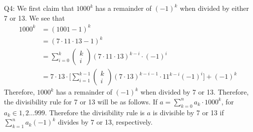\documentclass[letterpaper]{article}
\begin{document}
Q4: We first claim that $1000^k$ has a remainder of $(-1)^k$ when divided by either 7 or 13. We see that 
\begin{align*}
    1000^k & = (1001-1)^k
    \\ & = (7\cdot 11 \cdot 13 -1)^k
    \\ & = \sum_{i=0}^k \begin{pmatrix} k \\ i \end{pmatrix} (7\cdot 11 \cdot 13)^{k-i}\cdot (-1)^{i}
    \\ & = 7\cdot 13 \cdot \Bigg[\sum_{i=1}^{k-1}\begin{pmatrix} k \\ i \end{pmatrix} (7\cdot 13)^{k-i-1} \cdot 11^{k-i} (-1)^i \Bigg] + (-1)^k
\end{align*}Therefore, $1000^k$ has a remainder of $(-1)^k$ when divided by 7 or 13. Therefore, the divisibility rule for 7 or 13 will be as follows. If $a=\sum_{k=0}^n a_k\cdot 1000^k$, for $a_k\in 1,2 \dots 999$. Therefore the divisibility rule is $a$ is divisible by 7 or 13 if $\sum_{k=1}^n a_k (-1)^k$ divides by 7 or 13, respectively. 
\end{document}
